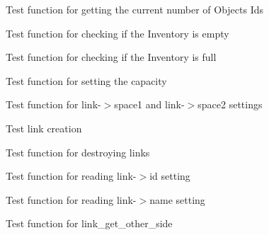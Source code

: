 \begin{DoxyRefList}
\item[\label{test__test000109}%
\hypertarget{test__test000109}{}%
Member \hyperlink{inventory__test_8h_a3546785f0cda504b4d16c89c19f0b23e}{test2\+\_\+inventory\+\_\+get\+\_\+objects\+\_\+number} ()]Test function for getting the current number of Objects Ids  
\item[\label{test__test000118}%
\hypertarget{test__test000118}{}%
Member \hyperlink{inventory__test_8h_a4d2a2a4d4ba59446d013debfe9bf05dc}{test2\+\_\+inventory\+\_\+is\+\_\+empty} ()]Test function for checking if the Inventory is empty  
\item[\label{test__test000121}%
\hypertarget{test__test000121}{}%
Member \hyperlink{inventory__test_8h_a1c9e567d4919d5aaccc9580815a8a81d}{test2\+\_\+inventory\+\_\+is\+\_\+full} ()]Test function for checking if the Inventory is full  
\item[\label{test__test000102}%
\hypertarget{test__test000102}{}%
Member \hyperlink{inventory__test_8h_aff93a7fb7ffbac1890ce563012a9d372}{test2\+\_\+inventory\+\_\+set\+\_\+max\+\_\+objects} ()]Test function for setting the capacity  
\item[\label{test__test000131}%
\hypertarget{test__test000131}{}%
Member \hyperlink{link__test_8h_a1a9f0d8d05848f9cc3f9f30097ca9452}{test2\+\_\+link\+\_\+add\+\_\+space} ()]Test function for link-\/$>$space1 and link-\/$>$space2 settings  
\item[\label{test__test000124}%
\hypertarget{test__test000124}{}%
Member \hyperlink{link__test_8h_a24b5463da176c3e578b0a0fa8bb1f9f0}{test2\+\_\+link\+\_\+create} ()]Test link creation  
\item[\label{test__test000145}%
\hypertarget{test__test000145}{}%
Member \hyperlink{link__test_8h_afae7294e1213cade145448511cfae536}{test2\+\_\+link\+\_\+destroy} ()]Test function for destroying links  
\item[\label{test__test000136}%
\hypertarget{test__test000136}{}%
Member \hyperlink{link__test_8h_a0f967a1782dd7264e73ad428d22d125d}{test2\+\_\+link\+\_\+get\+\_\+id} ()]Test function for reading link-\/$>$id setting  
\item[\label{test__test000138}%
\hypertarget{test__test000138}{}%
Member \hyperlink{link__test_8h_a4efc6cfcdc210e2803f9d285734c571e}{test2\+\_\+link\+\_\+get\+\_\+name} ()]Test function for reading link-\/$>$name setting  
\item[\label{test__test000142}%
\hypertarget{test__test000142}{}%
Member \hyperlink{link__test_8h_a9bb64e905b519d629239c31029ec4cd2}{test2\+\_\+link\+\_\+get\+\_\+other\+\_\+side} ()]Test function for link\+\_\+get\+\_\+other\+\_\+side  

\end{DoxyRefList}
